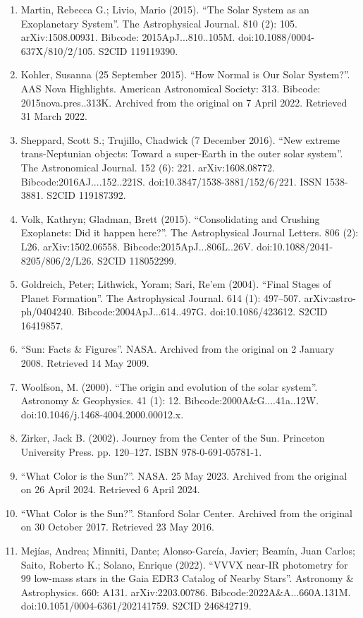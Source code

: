 \begin{enumerate}
\item Martin, Rebecca G.; Livio, Mario (2015). ``The Solar System as an Exoplanetary System''. The Astrophysical Journal. 810 (2): 105. arXiv:1508.00931. Bibcode: 2015ApJ...810..105M. doi:10.1088/0004-637X/810/2/105. S2CID 119119390.
\item Kohler, Susanna (25 September 2015). ``How Normal is Our Solar System?''. AAS Nova Highlights. American Astronomical Society: 313. Bibcode: 2015nova.pres..313K. Archived from the original on 7 April 2022. Retrieved 31 March 2022.
\item Sheppard, Scott S.; Trujillo, Chadwick (7 December 2016). ``New extreme trans-Neptunian objects: Toward a super-Earth in the outer solar system''. The Astronomical Journal. 152 (6): 221. arXiv:1608.08772. Bibcode:2016AJ....152..221S. doi:10.3847/1538-3881/152/6/221. ISSN 1538-3881. S2CID 119187392.
\item Volk, Kathryn; Gladman, Brett (2015). ``Consolidating and Crushing Exoplanets: Did it happen here?''. The Astrophysical Journal Letters. 806 (2): L26. arXiv:1502.06558. Bibcode:2015ApJ...806L..26V. doi:10.1088/2041-8205/806/2/L26. S2CID 118052299.
\item Goldreich, Peter; Lithwick, Yoram; Sari, Re'em (2004). ``Final Stages of Planet Formation''. The Astrophysical Journal. 614 (1): 497–507. arXiv:astro-ph/0404240. Bibcode:2004ApJ...614..497G. doi:10.1086/423612. S2CID 16419857.
\item ``Sun: Facts \& Figures''. NASA. Archived from the original on 2 January 2008. Retrieved 14 May 2009.
\item Woolfson, M. (2000). ``The origin and evolution of the solar system''. Astronomy \& Geophysics. 41 (1): 12. Bibcode:2000A\&G....41a..12W. doi:10.1046/j.1468-4004.2000.00012.x.
\item Zirker, Jack B. (2002). Journey from the Center of the Sun. Princeton University Press. pp. 120–127. ISBN 978-0-691-05781-1.
\item ``What Color is the Sun?''. NASA. 25 May 2023. Archived from the original on 26 April 2024. Retrieved 6 April 2024.
\item ``What Color is the Sun?''. Stanford Solar Center. Archived from the original on 30 October 2017. Retrieved 23 May 2016.
\item Mejías, Andrea; Minniti, Dante; Alonso-García, Javier; Beamín, Juan Carlos; Saito, Roberto K.; Solano, Enrique (2022). ``VVVX near-IR photometry for 99 low-mass stars in the Gaia EDR3 Catalog of Nearby Stars''. Astronomy \& Astrophysics. 660: A131. arXiv:2203.00786. Bibcode:2022A\&A...660A.131M. doi:10.1051/0004-6361/202141759. S2CID 246842719.

\end{enumerate}
